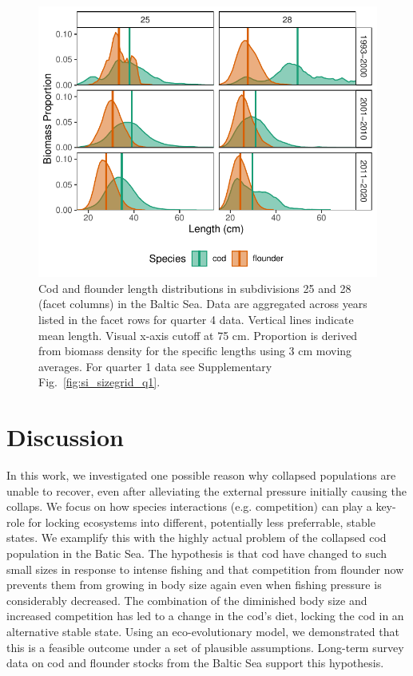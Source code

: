 \documentclass[9pt,twocolumn,twoside]{pnas-new}
\begin{document}
\begin{figure}%
\centering
\includegraphics[width=1\linewidth]{fig4.pdf}
\caption{Cod and flounder length distributions in subdivisions 25 and 28 (facet columns) in the Baltic Sea. Data are aggregated across years listed in the facet rows for quarter 4 data. Vertical lines indicate mean length. Visual x-axis cutoff at 75 cm. Proportion is derived from biomass density for the specific lengths using 3 cm moving averages. For quarter 1 data see Supplementary Fig.~\ref{fig:si_sizegrid_q1}.}
\label{fig:sizedist}
\end{figure}

\section*{Discussion}

In this work, we investigated one possible reason why collapsed populations are unable to recover, even after alleviating the external pressure initially causing the collaps. We focus on how species interactions (e.g. competition) can play a key-role for locking ecosystems into different, potentially less preferrable, stable states. We examplify this with the highly actual problem of the collapsed cod population in the Batic Sea. The hypothesis is that cod have changed to such small sizes in response to intense fishing and that competition from flounder now prevents them from growing in body size again even when fishing pressure is considerably decreased. The combination of the diminished body size and increased competition has led to a change in the cod's diet, locking the cod in an alternative stable state. Using an eco-evolutionary model, we demonstrated that this is a feasible outcome under a set of plausible assumptions. Long-term survey data on cod and flounder stocks from the Baltic Sea support this hypothesis.
\end{document}

